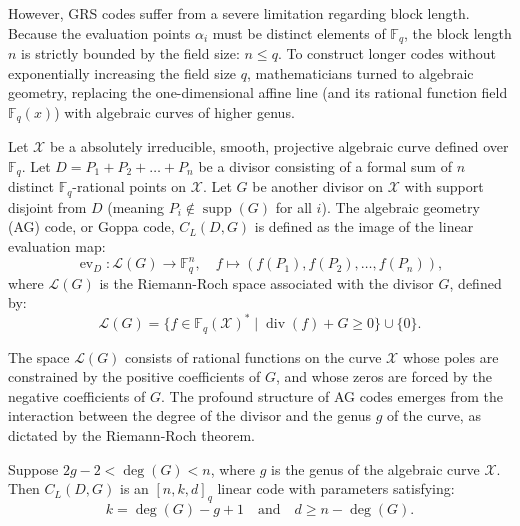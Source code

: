 However, GRS codes suffer from a severe limitation regarding block length. Because the evaluation points $\alpha_i$ must be distinct elements of $\mathbb{F}_q$, the block length $n$ is strictly bounded by the field size: $n \le q$. To construct longer codes without exponentially increasing the field size $q$, mathematicians turned to algebraic geometry, replacing the one-dimensional affine line (and its rational function field $\mathbb{F}_q(x)$) with algebraic curves of higher genus.

\begin{definition}
Let $\mathcal{X}$ be a absolutely irreducible, smooth, projective algebraic curve defined over $\mathbb{F}_q$. Let $D = P_1 + P_2 + \dots + P_n$ be a divisor consisting of a formal sum of $n$ distinct $\mathbb{F}_q$-rational points on $\mathcal{X}$. Let $G$ be another divisor on $\mathcal{X}$ with support disjoint from $D$ (meaning $P_i \notin \operatorname{supp}(G)$ for all $i$). The algebraic geometry (AG) code, or Goppa code, $C_L(D, G)$ is defined as the image of the linear evaluation map:
\[
\operatorname{ev}_D : \mathcal{L}(G) \to \mathbb{F}_q^n, \quad f \mapsto (f(P_1), f(P_2), \dots, f(P_n)),
\]
where $\mathcal{L}(G)$ is the Riemann-Roch space associated with the divisor $G$, defined by:
\[
\mathcal{L}(G) = \{f \in \mathbb{F}_q(\mathcal{X})^* \mid \operatorname{div}(f) + G \ge 0\} \cup \{0\}.
\]
\end{definition}

The space $\mathcal{L}(G)$ consists of rational functions on the curve $\mathcal{X}$ whose poles are constrained by the positive coefficients of $G$, and whose zeros are forced by the negative coefficients of $G$. The profound structure of AG codes emerges from the interaction between the degree of the divisor and the genus $g$ of the curve, as dictated by the Riemann-Roch theorem.

\begin{theorem}
\label{thm:ag_codes}
Suppose $2g - 2 < \deg(G) < n$, where $g$ is the genus of the algebraic curve $\mathcal{X}$. Then $C_L(D, G)$ is an $[n, k, d]_q$ linear code with parameters satisfying:
\[
k = \deg(G) - g + 1 \quad \text{and} \quad d \ge n - \deg(G).
\]
\end{theorem}

